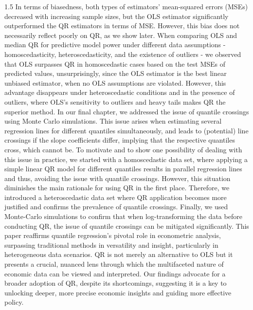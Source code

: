 \documentclass[conference]{IEEEtran}
\begin{document}
\begin{spacing}{1.5}
In terms of biasedness, both types of estimators' mean-squared errors (MSEs) decreased with increasing sample sizes, but the OLS estimator significantly outperformed the QR estimators in terms of MSE. However, this bias does not necessarily reflect poorly on QR, as we show later.
When comparing OLS and median QR for predictive model power under different data assumptions -  homoscedasticity, heteroscedasticity, and the existence of outliers - we observed that OLS surpasses QR in homoscedastic cases based on the test MSEs of predicted values, unsurprisingly, since the OLS estimator is the best linear unbiased estimator, when no OLS assumptions are violated. However, this advantage disappears under heteroscedastic conditions and in the presence of outliers, where OLS's sensitivity to outliers and heavy tails makes QR the superior method.
In our final chapter, we addressed the issue of quantile crossings using Monte Carlo simulations. This issue arises when estimating several regression lines for different quantiles simultaneously, and leads to (potential) line crossings if the slope coefficients differ, implying that the respective quantiles cross, which cannot be.
To motivate and to show one possibility of dealing with this issue in practice, we started with a homoscedastic data set, where applying a simple linear QR model for different quantiles results in parallel regression lines and thus, avoiding the issue with quantile crossings. 
However, this situation diminishes the main rationale for using QR in the first place.
Therefore, we introduced a heteroscedastic data set where QR application becomes more justified and confirms the prevalence of quantile crossings. Finally, we used Monte-Carlo simulations to confirm that when log-transforming the data before conducting QR, the issue of quantile crossings can be mitigated significantly.
This paper reaffirms quantile regression's pivotal role in econometric analysis, surpassing traditional methods in versatility and insight, particularly in heterogeneous data scenarios. QR is not merely an alternative to OLS but it presents a crucial, nuanced lens through which the multifaceted nature of economic data can be viewed and interpreted. Our findings advocate for a broader adoption of QR, despite its shortcomings, suggesting it is a key to unlocking deeper, more precise economic insights and guiding more effective policy.
\end{spacing}
\end{document}
